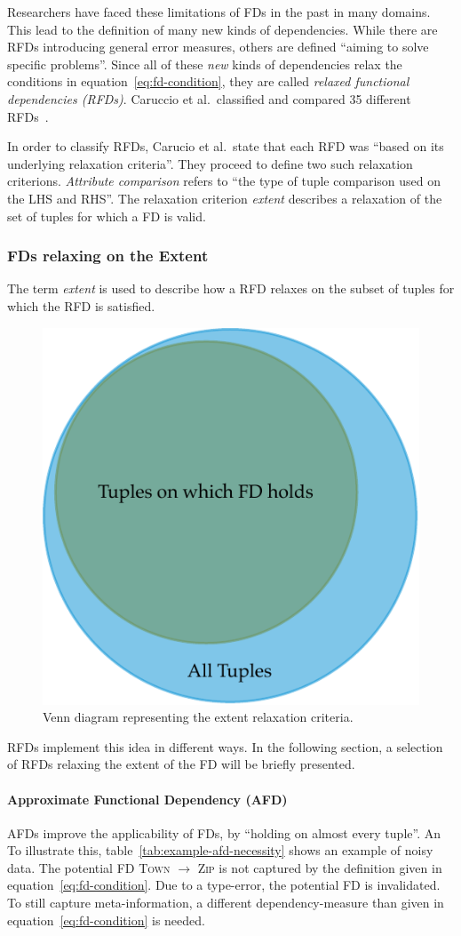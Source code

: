Researchers have faced these limitations of FDs in the past in many domains.
This lead to the definition of many new kinds of dependencies.
While there are RFDs introducing general error measures, others are defined ``aiming to solve specific problems''\cite[p.~147]{CAR16}.
Since all of these \emph{new} kinds of dependencies relax the conditions in equation~\ref{eq:fd-condition}, they are called \emph{relaxed functional dependencies (RFDs)}.
Caruccio et al.\ classified and compared 35 different RFDs~\cite[p.~151]{CAR16}.

In order to classify RFDs, Carucio et al.\ state that each RFD was ``based on its underlying relaxation criteria''\cite[p.~149]{CAR16}.
They proceed to define two such relaxation criterions.
\emph{Attribute comparison} refers to ``the type of tuple comparison used on the LHS and RHS''.
The relaxation criterion \emph{extent} describes a relaxation of the set of tuples for which a FD is valid.

\subsubsection{FDs relaxing on the Extent}
The term \emph{extent} is used to describe how a RFD relaxes on the subset of tuples for which the RFD is satisfied.

\begin{figure}[ht]
     \centering
     \includegraphics[width=.4\textwidth]{images/rfds-extent.pdf}
     \caption{Venn diagram representing the extent relaxation criteria.}
     \label{fig:rfds-extent}
 \end{figure}

RFDs implement this idea in different ways.
In the following section, a selection of RFDs relaxing the extent of the FD will be briefly presented.

\paragraph{Approximate Functional Dependency (AFD)}
AFDs improve the applicability of FDs, by ``holding on almost every tuple''\cite[p.~151]{CAR16}.
An To illustrate this, table~\ref{tab:example-afd-necessity} shows an example of noisy data.
The potential FD \textsc{Town} \(\to\) \textsc{Zip} is not captured by the definition given in equation~\ref{eq:fd-condition}.
Due to a type-error, the potential FD is invalidated.
To still capture meta-information, a different dependency-measure than given in equation~\ref{eq:fd-condition} is needed.

